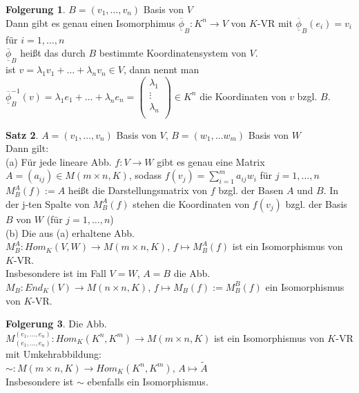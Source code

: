\documentclass[10pt,a4paper,numbers=endperiod]{scrartcl}
\theoremstyle{definition}
\newtheorem{satz}{Satz}[section]
\newtheorem{folg}[satz]{Folgerung}
\begin{document}
\begin{folg}
	$B = (v_1,\ldots,v_n)$ Basis von $V$\\
	Dann gibt es genau einen Isomorphimus $\overline{\underline{\phi}}_B: K^n \rightarrow V$ von $K$-VR mit $\overline{\underline{\phi}}_B(e_i) = v_i$ für $i=1,\ldots,n$\\
	 $\overline{\underline{\phi}}_B$ heißt das durch $B$ bestimmte Koordinatensystem von $V$.\\
	 ist $v=\lambda_1v_1+\ldots+\lambda_nv_n \in V$, dann nennt man $\overline{\underline{\phi}}_B^{-1}(v) = \lambda_1e_1+\ldots+\lambda_ne_n = \begin{pmatrix}
	 \lambda_1\\
	 \vdots\\
	 \lambda_n\\
	 \end{pmatrix} \in K^n$ die Koordinaten von $v$ bzgl. $B$.
\end{folg}

\begin{satz}
	$A = (v_1,\ldots,v_n)$ Basis von $V$, $B=(w_1,\ldots w_m)$ Basis von $W$\\
	Dann gilt:\\
	(a) Für jede lineare Abb. $f:V \rightarrow W$ gibt es genau eine Matrix $A=(a_{ij}) \in M(m\times n,K)$, sodass $f(v_j)=\sum_{i=1}^{m}a_{ij}w_i$ für $j=1,\ldots,n$\\
	$M_B^A(f) := A$ heißt die Darstellungsmatrix von $f$ bzgl. der Basen $A$ und $B$. In der j-ten Spalte von $M_B^A(f)$ stehen die Koordinaten von $f(v_j)$ bzgl. der Basis $B$ von $W$ (für $j=1,\ldots,n$)\\
	(b) Die aus (a) erhaltene Abb.\\
	$M_B^A: Hom_K(V,W) \rightarrow M(m \times n,K)$, $f\mapsto M_B^A(f)$ ist ein Isomorphismus von $K$-VR.\\ Insbesondere ist im Fall $V=W$, $A=B$ die Abb.\\
	$M_B: End_K(V) \rightarrow M(n \times n,K)$, $f\mapsto M_B(f) := M_B^B(f)$ ein Isomorphismus von $K$-VR.
\end{satz}

\begin{folg}
	Die Abb.\\
	$M_{(e_1,\ldots,e_n)}^{(e_1,\ldots,e_n)}: Hom_K(K^n,K^m) \rightarrow M(m\times n,K)$ ist ein Isomorphismus von $K$-VR mit Umkehrabbildung:\\
	$\sim: M(m\times n,K) \rightarrow Hom_K(K^n,K^m)$, $A \mapsto \tilde{A}$\\
	Insbesondere ist $\sim$ ebenfalls ein Isomorphismus. 
\end{folg}
\end{document}
